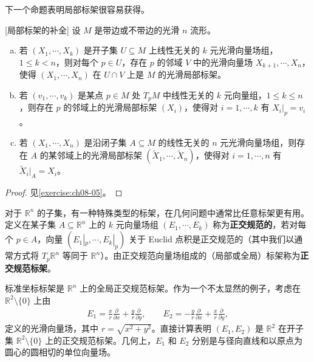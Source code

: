 \documentclass[../../main.tex]{subfiles}
\begin{document}
下一个命题表明局部标架很容易获得。

\begin{proposition}\label{proposition:ch08-11}[局部标架的补全]
设 $M$ 是带边或不带边的光滑 $n$ 流形。
\begin{enumerate}[(a)]
\item 若 $(X_1,\cdots ,X_k)$ 是开子集 $U\subseteq M$ 上线性无关的 $k$ 元光滑向量场组，$1\leqslant k<n$，则对每个 $p\in U$，存在 $p$ 的邻域 $V$ 中的光滑向量场 $X_{k+1},\cdots ,X_n$，使得 $(X_1,\cdots ,X_n)$ 在 $U\cap V$ 上是 $M$ 的光滑局部标架。

\item 若 $(v_1,\cdots ,v_k)$ 是某点 $p\in M$ 处 $T_pM$ 中线性无关的 $k$ 元向量组，$1\leqslant k\leqslant n$，则存在 $p$ 的邻域上的光滑局部标架 $(X_i)$，使得对 $i=1,\cdots ,k$ 有 $X_i|_p=v_i$。

\item 若 $(X_1,\cdots ,X_n)$ 是沿闭子集 $A\subseteq M$ 的线性无关的 $n$ 元光滑向量场组，则存在 $A$ 的某邻域上的光滑局部标架 $(\widetilde{X}_1,\cdots ,\widetilde{X}_n)$，使得对 $i=1,\cdots ,n$ 有 $\widetilde{X}_i|_A=X_i$。
\end{enumerate}
\end{proposition}

\begin{proof}
见\cref{exercise:ch08-05}。
\end{proof}

对于 $\mathbb{R}^n$ 的子集，有一种特殊类型的标架，在几何问题中通常比任意标架更有用。定义在某子集 $A\subseteq\mathbb{R}^n$ 上的 $k$ 元向量场组 $(E_1,\cdots ,E_k)$ 称为\textbf{正交规范的}，若对每个 $p\in A$，向量 $(E_1|_p,\cdots ,E_k|_p)$ 关于 Euclid 点积是正交规范的（其中我们以通常方式将 $T_p\mathbb{R}^n$ 等同于 $\mathbb{R}^n$）。由正交规范向量场组成的（局部或全局）标架称为\textbf{正交规范标架}。

\begin{example}\label{example:ch08-12}
标准坐标标架是 $\mathbb{R}^n$ 上的全局正交规范标架。作为一个不太显然的例子，考虑在 $\mathbb{R}^2\setminus\{0\}$ 上由
\begin{align}
E_1=\frac{x}{r}\frac{\partial}{\partial x}+\frac{y}{r}\frac{\partial}{\partial y},\qquad
E_2=-\frac{y}{r}\frac{\partial}{\partial x}+\frac{x}{r}\frac{\partial}{\partial y},\label{align:ch08-03}
\end{align}
定义的光滑向量场，其中 $r=\sqrt{x^2+y^2}$。直接计算表明 $(E_1,E_2)$ 是 $\mathbb{R}^2$ 在开子集 $\mathbb{R}^2\setminus\{0\}$ 上的正交规范标架。几何上，$E_1$ 和 $E_2$ 分别是与径向直线和以原点为圆心的圆相切的单位向量场。
\end{example}
\end{document}
